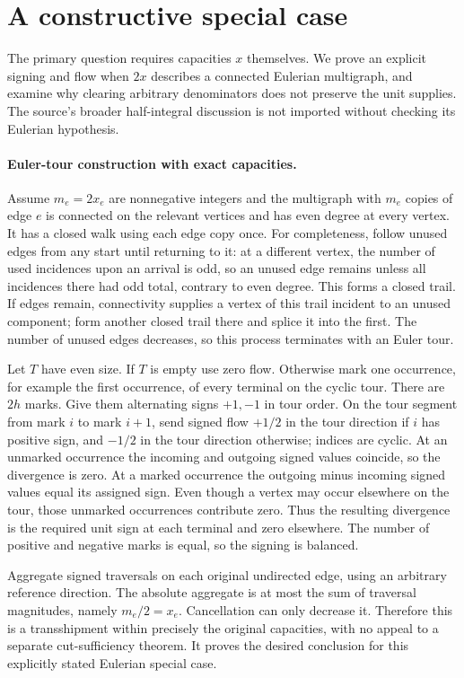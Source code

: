 \documentclass[11pt]{article}
\begin{document}
\section{A constructive special case}
The primary question requires capacities $x$ themselves. We prove
an explicit signing and flow when $2x$ describes a connected
Eulerian multigraph, and examine why clearing arbitrary denominators
does not preserve the unit supplies. The source's broader half-integral
discussion is not imported without checking its Eulerian hypothesis.

\paragraph{Euler-tour construction with exact capacities.}
Assume $m_e=2x_e$ are nonnegative integers and the multigraph
with $m_e$ copies of edge $e$ is connected on the relevant
vertices and has even degree at every vertex. It has a closed
walk using each edge copy once. For completeness, follow unused
edges from any start until returning to it: at a different vertex,
the number of used incidences upon an arrival is odd, so an
unused edge remains unless all incidences there had odd total,
contrary to even degree. This forms a closed trail. If edges
remain, connectivity supplies a vertex of this trail incident to
an unused component; form another closed trail there and splice it
into the first. The number of unused edges decreases, so this
process terminates with an Euler tour.

Let $T$ have even size. If $T$ is empty use zero flow.
Otherwise mark one occurrence, for example the first occurrence,
of every terminal on the cyclic tour. There are $2h$ marks.
Give them alternating signs $+1,-1$ in tour order. On the
tour segment from mark $i$ to mark $i+1$, send signed
flow $+1/2$ in the tour direction if $i$ has positive sign,
and $-1/2$ in the tour direction otherwise; indices are cyclic.
At an unmarked occurrence the incoming and outgoing signed values
coincide, so the divergence is zero. At a marked occurrence the
outgoing minus incoming signed values equal its assigned sign.
Even though a vertex may occur elsewhere on the tour, those
unmarked occurrences contribute zero. Thus the resulting divergence
is the required unit sign at each terminal and zero elsewhere.
The number of positive and negative marks is equal, so the signing
is balanced.

Aggregate signed traversals on each original undirected edge, using
an arbitrary reference direction. The absolute aggregate is at most
the sum of traversal magnitudes, namely $m_e/2=x_e$.
Cancellation can only decrease it. Therefore this is a transshipment
within precisely the original capacities, with no appeal to a
separate cut-sufficiency theorem. It proves the desired conclusion
for this explicitly stated Eulerian special case.
\end{document}

